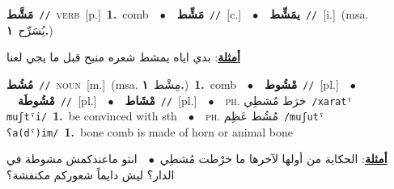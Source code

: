 \documentclass[10pt,a4paper,twoside]{article} %
\begin{document}
\begin{multicols}{2}
{\setlength\topsep{0pt}\textbf{\foreignlanguage{arabic}{مَشَّط}}\ {\color{gray}\texttt{//}\color{black}}\ \textsc{verb}\ [p.]\ \textbf{1.}~comb\ \ $\bullet$\ \ \setlength\topsep{0pt}\textbf{\foreignlanguage{arabic}{مَشِّط}}\ {\color{gray}\texttt{//}\color{black}}\ [c.]\ \ $\bullet$\ \ \setlength\topsep{0pt}\textbf{\foreignlanguage{arabic}{يمَشِّط}}\ {\color{gray}\texttt{//}\color{black}}\ [i.]\ \color{gray}(msa. \foreignlanguage{arabic}{يُسَرِّح}~\foreignlanguage{arabic}{\textbf{١.}})\color{black}\  \begin{flushright}\color{gray}\foreignlanguage{arabic}{\textbf{\underline{\foreignlanguage{arabic}{أمثلة}}}: بدي اياه يمشط شعره منيح قبل ما يجي لعنا}\end{flushright}\color{black}} \vspace{2mm}

{\setlength\topsep{0pt}\textbf{\foreignlanguage{arabic}{مُشُط}}\ {\color{gray}\texttt{//}\color{black}}\ \textsc{noun}\ [m.]\ \color{gray}(msa. \foreignlanguage{arabic}{مِشْط}~\foreignlanguage{arabic}{\textbf{١.}})\color{black}\ \textbf{1.}~comb\ \ $\bullet$\ \ \setlength\topsep{0pt}\textbf{\foreignlanguage{arabic}{مْشُوط}}\ {\color{gray}\texttt{//}\color{black}}\ [pl.]\ \ $\bullet$\ \ \setlength\topsep{0pt}\textbf{\foreignlanguage{arabic}{مْشُوطَة}}\ {\color{gray}\texttt{//}\color{black}}\ [pl.]\ \ $\bullet$\ \ \setlength\topsep{0pt}\textbf{\foreignlanguage{arabic}{مْشَاط}}\ {\color{gray}\texttt{//}\color{black}}\ [pl.]\ \ $\bullet$\ \ \textsc{ph.} \color{gray} \foreignlanguage{arabic}{خرَط مُشطِي}\color{black}\ {\color{gray}\texttt{/{\sffamily xaratˤ muʃtˤi}/}\color{black}}\ \textbf{1.}~be convinced with sth\ \ $\bullet$\ \ \textsc{ph.} \color{gray} \foreignlanguage{arabic}{مُشُط عَظِم}\color{black}\ {\color{gray}\texttt{/{\sffamily muʃutˤ ʕa(dˤ)im}/}\color{black}}\ \textbf{1.}~bone comb is made of horn or animal bone\  \begin{flushright}\color{gray}\foreignlanguage{arabic}{\textbf{\underline{\foreignlanguage{arabic}{أمثلة}}}: الحكاية من أولها لآخرها ما خرْطت مُشطِي\ $\bullet$\ \  انتو ماعندكمش مشوطة في الدار؟ ليش دايماً شعوركم مكنفشة؟}\end{flushright}\color{black}} \vspace{2mm}


\end{multicols}
\end{document}
